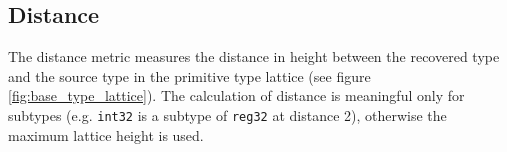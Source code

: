 
\subsection{Distance}

The distance metric measures the distance in height between the recovered type and the source type in the primitive type lattice (see figure \ref{fig:base_type_lattice}). The calculation of distance is meaningful only for subtypes (e.g. \texttt{int32} is a subtype of \texttt{reg32} at distance 2), otherwise the maximum lattice height is used.

